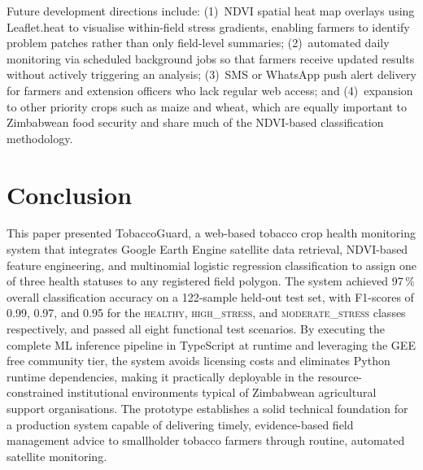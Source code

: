 \documentclass[conference]{IEEEtran}
\begin{document}
Future development directions include: (1)~NDVI spatial heat map overlays
using Leaflet.heat to visualise within-field stress gradients, enabling
farmers to identify problem patches rather than only field-level
summaries; (2)~automated daily monitoring via scheduled background jobs
so that farmers receive updated results without actively triggering an
analysis; (3)~SMS or WhatsApp push alert delivery for farmers and
extension officers who lack regular web access; and (4)~expansion to
other priority crops such as maize and wheat, which are equally important
to Zimbabwean food security and share much of the NDVI-based
classification methodology.

\section{Conclusion}

This paper presented TobaccoGuard, a web-based tobacco crop health
monitoring system that integrates Google Earth Engine satellite data
retrieval, NDVI-based feature engineering, and multinomial logistic
regression classification to assign one of three health statuses to any
registered field polygon. The system achieved 97\,\% overall
classification accuracy on a 122-sample held-out test set, with F1-scores
of 0.99, 0.97, and 0.95 for the \textsc{healthy}, \textsc{high\_stress},
and \textsc{moderate\_stress} classes respectively, and passed all eight
functional test scenarios. By executing the complete ML inference pipeline
in TypeScript at runtime and leveraging the GEE free community tier, the
system avoids licensing costs and eliminates Python runtime dependencies,
making it practically deployable in the resource-constrained institutional
environments typical of Zimbabwean agricultural support organisations.
The prototype establishes a solid technical foundation for a production
system capable of delivering timely, evidence-based field management
advice to smallholder tobacco farmers through routine, automated satellite
monitoring.
\end{document}
